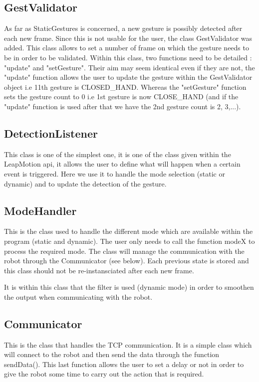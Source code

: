 \subsection{GestValidator}

As far as StaticGestures is concerned, a new gesture is possibly detected after each new frame. Since this is not usable for the user, the class GestValidator was added. This class allows to set a number of frame on which the gesture needs to be in order to be validated.
Within this class, two functions need to be detailed : "update" and "setGesture". Their aim may seem identical even if they are not, the "update" function allows the user to update the gesture within the GestValidator object i.e 11th gesture is CLOSED\_HAND. Whereas the "setGesture" function sets the gesture count to 0 i.e 1st gesture is now CLOSE\_HAND (and if the "update" function is used after that we have the 2nd gesture count is 2, 3,...).

\subsection{DetectionListener}

This class is one of the simplest one, it is one of the class given within the LeapMotion api, it allows the user to define what will happen when a certain event is triggered.
Here we use it to handle the mode selection (static or dynamic) and to update the detection of the gesture.

\subsection{ModeHandler}

This is the class used to handle the different mode which are available within the program (static and dynamic). The user only needs to call the function modeX to process the required mode. The class will manage the communication with the robot through the Communicator (see below). Each previous state is stored and this class should not be re-instansciated after each new frame.

It is within this class that the filter is used (dynamic mode) in order to smoothen the output when communicating with the robot.

\subsection{Communicator}

This is the class that handles the TCP communication. It is a simple class which will connect to the robot and then send the data through the function sendData(). This last function allows the user to set a delay or not in order to give the robot some time to carry out the action that is required.
